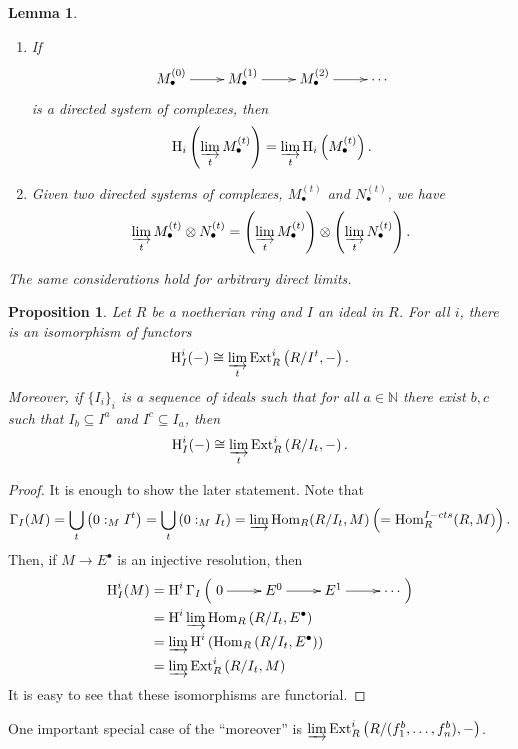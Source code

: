 \documentclass[11pt]{book}
\newtheorem{lemma}[theorem]{Lemma}
\newtheorem{proposition}[theorem]{Proposition}
\numberwithin{equation}{section}
\numberwithin{theorem}{chapter}
\theoremstyle{definition}
\newtheorem*{basic properties}{Basic Properties}
\newtheorem*{Important Remark}{Important Remark}
\theoremstyle{remark}
\newcommand{\NN}{\mathbb{N}}
\newcommand{\Hom}{\operatorname{Hom}}
\newcommand{\Ext}{\operatorname{Ext}}
\renewcommand{\H}{\operatorname{H}}
\begin{document}
\begin{lemma} 
$\,$
\begin{enumerate}[(1)]
	\item If
	$$\xymatrix{M_\bullet^{(0)} \ar[r] & M_\bullet^{(1)} \ar[r] & M_\bullet^{(2)} \ar[r] & \cdots}$$
	is a directed system of complexes, then
	$$\H_i \left( \varinjlim_t M_\bullet^{(t)} \right) = \varinjlim_t \H_i \left( M_\bullet^{(t)} \right).$$
	\item Given two directed systems of complexes, $M_\bullet^{(t)}$ and $N_\bullet^{(t)}$, we have
	$$\varinjlim_t M_\bullet^{(t)} \otimes N_\bullet^{(t)} = \left( \varinjlim_t M_\bullet^{(t)} \right) \otimes \left( \varinjlim_t N_\bullet^{(t)} \right).$$
\end{enumerate}
The same considerations hold for arbitrary direct limits.
\end{lemma}


\begin{proposition}
	Let $R$ be a noetherian ring and $I$ an ideal in $R$. For all $i$, there is an isomorphism of functors
	$$\H^i_I(-) \cong \varinjlim_t \Ext^i_R \left( R/I^t, -\right).$$
	Moreover, if $\lbrace I_i \rbrace_i$ is a sequence of ideals such that for all $a \in \NN$ there exist $b, c$ such that $I_b \subseteq I^a$ and $I^c \subseteq I_a$, then
	$$\H^i_I(-) \cong \varinjlim_t \Ext^i_R \left( R/I_t, -\right).$$
\end{proposition}

\begin{proof}
	It is enough to show the later statement. Note that 
	$$\Gamma_I(M) = \bigcup_t \left( 0 :_M I^t \right) = \bigcup_t \left( 0 :_M I_t \right) = \varinjlim \Hom_R(R/I_t,M) \left( = \Hom^{I-cts}_R(R,M) \right).$$
Then, if $M \longrightarrow E^{\bullet}$ is an injective resolution, then
\begin{align*}
	\H^i_I(M) & = \H^i \Gamma_I \left( \xymatrix{0 \ar[r] & E^0 \ar[r] & E^1 \ar[r] & \cdots} \right) \\
	& = \H^i \varinjlim \Hom_R \left( R/I_t, E^{\bullet} \right) \\
	& = \varinjlim \H^i \left( \Hom_R \left( R/I_t, E^{\bullet} \right) \right) \\
	& = \varinjlim \Ext^i_R \left( R/I_t, M \right) 
\end{align*}
It is easy to see that these isomorphisms are functorial.
\end{proof}

One important special case of the ``moreover'' is $\varinjlim \Ext^i_R \left(R/(f_1^b, \ldots, f_n^b), - \right)$. 
\end{document}
